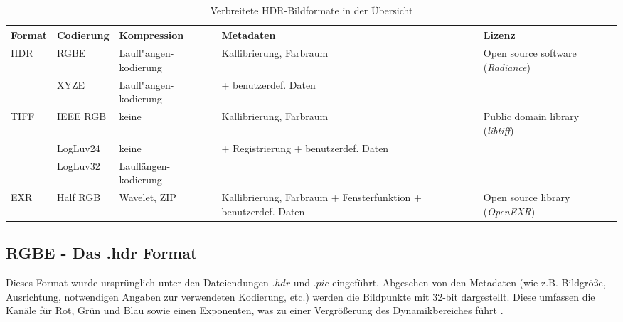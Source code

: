 \begin{table}
  \begin{center}
    \begin{tabularx}{\textwidth}{l|XXXX}
	\toprule
	Format & Codierung & Kompression & Metadaten & Lizenz \\
	\midrule
	HDR & RGBE & Laufl"angen-\newline kodierung & Kallibrierung, \newline Farbraum & Open source software (\textit{Radiance})\\
	& XYZE & Laufl"angen-\newline kodierung & + benutzerdef. Daten & \\
	\midrule
	TIFF & IEEE RGB & keine & Kallibrierung, \newline Farbraum & Public domain library (\textit{libtiff})\\
	& LogLuv24 & keine & + Registrierung \newline + benutzerdef. Daten& \\
	& LogLuv32 & Lauflängen-\newline kodierung & & \\
	\midrule
	EXR & Half RGB & Wavelet, ZIP & Kallibrierung, \newline Farbraum \newline+ Fensterfunktion \newline + benutzerdef. Daten & Open source library (\textit{OpenEXR})\\
	\bottomrule
    \end{tabularx}
    \caption{Verbreitete HDR-Bildformate in der Übersicht \cite[S.89]{Reinhard}}
    \label{tab:formats}
  \end{center}
\end{table}

\subsection{RGBE - Das .hdr Format}

Dieses Format wurde ursprünglich unter den Dateiendungen $.hdr$ und $.pic$ eingeführt. Abgesehen von den Metadaten (wie z.B. Bildgröße, Ausrichtung, notwendigen Angaben zur verwendeten Kodierung, etc.) werden die Bildpunkte mit 32-bit dargestellt. Diese umfassen die Kanäle für Rot, Grün und Blau sowie einen Exponenten, was zu einer Vergrößerung des Dynamikbereiches führt \cite[S. 92]{Reinhard}.

